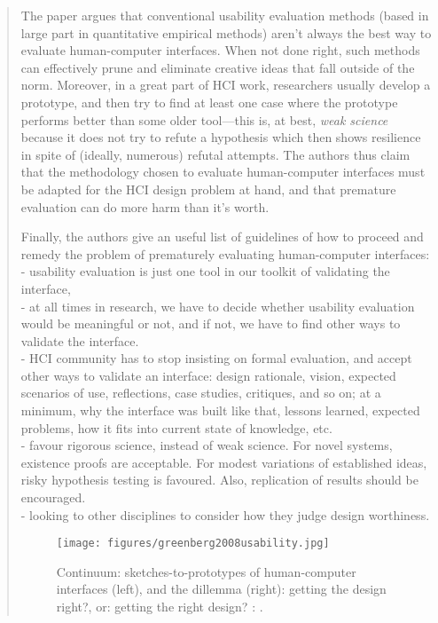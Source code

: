 		\begin{quote}
		\small
		The paper argues that conventional usability evaluation methods (based in large
		part in quantitative empirical methods) aren't always the best way to evaluate human-computer interfaces.
		When not done right, such methods can effectively prune and eliminate creative ideas
		that fall outside of the norm. Moreover, in a great part of HCI work,
		researchers usually develop a prototype, and then try to find at least one
		case where the prototype performs better than some older tool---this is, at 
		best, {\em weak science} because it does not try to refute a hypothesis which
		then shows resilience in spite of (ideally, numerous) refutal attempts. 
		The authors thus claim that the methodology chosen to 
		evaluate human-computer interfaces must be adapted for the HCI design 
		problem at hand, and that premature evaluation can do more harm than it's worth.	
		
		Finally, the authors give an useful list of guidelines of how to proceed and
		remedy the problem of prematurely evaluating human-computer interfaces:\\
		- usability evaluation is just one tool in our toolkit of validating the interface,\\
		- at all times in research, we have to decide whether usability evaluation would be
		  meaningful or not, and if not, we have to find other ways to validate the interface.\\
		- HCI community has to stop insisting on formal evaluation, and accept other
		  ways to validate an interface: design rationale, vision, expected scenarios of use,
		  reflections, case studies, critiques, and so on; at a minimum, why the interface
		  was built like that, lessons learned, expected problems, how it fits into
		  current state of knowledge, etc.\\
		- favour rigorous science, instead of weak science. For novel systems,
		  existence proofs are acceptable.  For modest variations of established 
		  ideas, risky hypothesis testing is favoured. Also, replication of results should be encouraged.\\
		- looking to other disciplines to consider how they judge design worthiness.  
		\begin{figure}[htb]
		\begin{center}
		\texttt{[image: figures/greenberg2008usability.jpg]}
		\caption{
		Continuum: sketches-to-prototypes of human-computer interfaces (left),
		and the dillemma (right): getting the design right?, or: getting the right design?
		\citeauthor{greenberg2008usability}: 
		\cite{greenberg2008usability}.}
		\label{fig:greenberg2008usability}
		\end{center}
		\end{figure}
		
		\end{quote}

